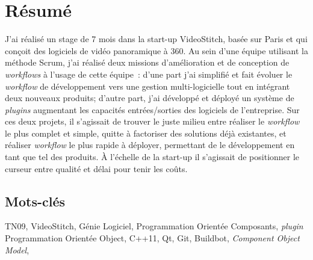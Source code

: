 \newpage
\section*{Résumé}
J'ai réalisé un stage de 7 mois dans la start-up VideoStitch, basée sur Paris et qui
conçoit des logiciels de vidéo panoramique à 360\degree. Au sein d'une équipe utilisant
la méthode Scrum, j'ai réalisé deux missions d'amélioration et de conception de
\textit{workflows} à l'usage de cette équipe~: d'une part j'ai simplifié et fait évoluer
le \textit{workflow} de développement vers une gestion multi-logicielle
tout en intégrant deux nouveaux produits; d'autre part, j'ai développé
et déployé un système de \textit{plugins} augmentant les capacités entrées/sorties
des logiciels de l'entreprise. Sur ces deux projets, il s'agissait de trouver le
juste milieu entre réaliser le \textit{workflow} le plus complet et simple, 
quitte à factoriser des solutions déjà existantes, et réaliser \textit{workflow} 
le plus rapide à déployer, permettant de le développement en tant que tel des produits. 
À l'échelle de la start-up il s'agissait de positionner le curseur entre qualité
et délai pour tenir les coûts.

\subsection*{Mots-clés}
TN09, VideoStitch, Génie Logiciel, Programmation Orientée Composants, \textit{plugin}
Programmation Orientée Object, C++11, Qt, Git, Buildbot, \textit{Component Object Model},
